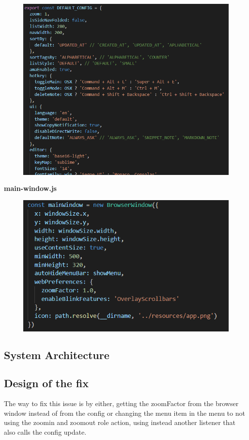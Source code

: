 \documentclass[main.tex]{subfiles}
\begin{document}
\begin{figure}[h]
\includegraphics[scale=0.5]{images/export.png}
\centering
\end{figure}
\clearpage

\textbf{main-window.js}

\begin{figure}[h]
\includegraphics[scale=0.7]{images/mainWindow.png}
\centering
\end{figure}


\subsection{System Architecture}

\subsection{Design of the fix}

The way to fix this issue is by either, getting the zoomFactor from the browser window instead of from the config or changing the menu item in the menu to not using the zoomin and zoomout role action, using instead another listener that also calls the config update.

\nocite{*}
\end{document}
